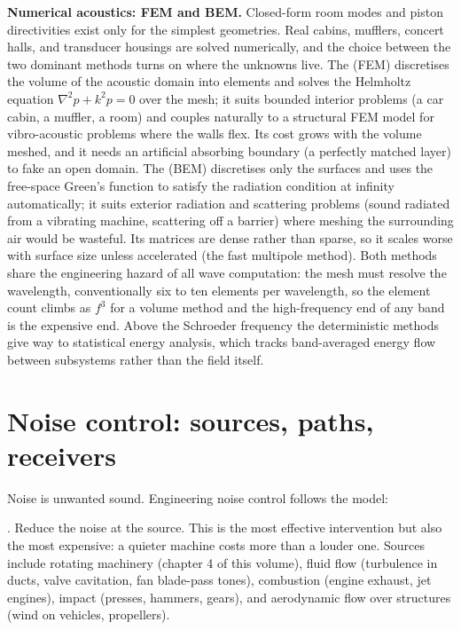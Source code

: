 

\begin{mastery}
\textbf{Numerical acoustics: FEM and BEM.} Closed-form room modes and
piston directivities exist only for the simplest geometries. Real
cabins, mufflers, concert halls, and transducer housings are solved
numerically, and the choice between the two dominant methods turns on
where the unknowns live. The  (FEM)
discretises the volume of the acoustic domain into elements and solves
the Helmholtz equation $\nabla^2 p + k^2 p = 0$ over the mesh; it suits
bounded interior problems (a car cabin, a muffler, a room) and couples
naturally to a structural FEM model for vibro-acoustic problems where
the walls flex. Its cost grows with the volume meshed, and it needs an
artificial absorbing boundary (a perfectly matched layer) to fake an
open domain. The  (BEM) discretises
only the surfaces and uses the free-space Green's function to satisfy
the radiation condition at infinity automatically; it suits exterior
radiation and scattering problems (sound radiated from a vibrating
machine, scattering off a barrier) where meshing the surrounding air
would be wasteful. Its matrices are dense rather than sparse, so it
scales worse with surface size unless accelerated (the fast multipole
method). Both methods share the engineering hazard of all wave
computation: the mesh must resolve the wavelength, conventionally six
to ten elements per wavelength, so the element count climbs as
$f^3$ for a volume method and the high-frequency end of any band is the
expensive end. Above the Schroeder frequency the deterministic methods
give way to statistical energy analysis, which tracks band-averaged
energy flow between subsystems rather than the field itself.
\end{mastery}

\section{Noise control: sources, paths, receivers}

Noise is unwanted sound. Engineering noise control follows the
 model:

. Reduce the noise at the source. This is the most
effective intervention but also the most expensive: a quieter
machine costs more than a louder one. Sources include rotating
machinery (chapter 4 of this volume), fluid flow (turbulence in
ducts, valve cavitation, fan blade-pass tones), combustion (engine
exhaust, jet engines), impact (presses, hammers, gears), and
aerodynamic flow over structures (wind on vehicles, propellers).

